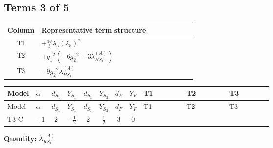 \documentclass[8pt]{article}
\begin{document}
\begin{landscape}
\subsection*{Terms 3 of 5}
\begin{center}
\begin{tabular}{@{}c >{\raggedright\arraybackslash}p{0.82\linewidth}@{}}
\toprule
Column & Representative term structure \\
\midrule
T1 & \(\displaystyle +\frac{16}{3} {\lambda_5} \left({\lambda_5}\right)^{*}\) \\
\midrule
T2 & \(\displaystyle +{g_1}^2 \left(-6 {g_2}^2-3 {\lambda_{HS_1}^{(A)}}\right)\) \\
\midrule
T3 & \(\displaystyle -9 {g_2}^2 {\lambda_{HS_1}^{(A)}}\) \\
\midrule
\bottomrule
\end{tabular}
\end{center}
\smallskip
\tiny
\begin{longtable}{@{}llcccccc >{\raggedright\arraybackslash}p{0.21\linewidth} >{\raggedright\arraybackslash}p{0.21\linewidth} >{\raggedright\arraybackslash}p{0.21\linewidth}@{}}
\toprule
Model & $\alpha$ & $d_{S_1}$ & $Y_{S_1}$ & $d_{S_2}$ & $Y_{S_2}$ & $d_F$ & $Y_F$ & T1 & T2 & T3 \\
\midrule
\endfirsthead
\toprule
Model & $\alpha$ & $d_{S_1}$ & $Y_{S_1}$ & $d_{S_2}$ & $Y_{S_2}$ & $d_F$ & $Y_F$ & T1 & T2 & T3 \\
\midrule
\endhead
T3-C & $-1$ & $2$ & $-\frac{1}{2}$ & $2$ & $\frac{1}{2}$ & $3$ & $0$ & \scriptsize\adjustbox{max width=\linewidth}{$\begin{gathered} +\frac{16}{3} {\lambda_5} \left({\lambda_5}\right)^{*}\end{gathered}$} & \scriptsize\adjustbox{max width=\linewidth}{$\begin{gathered} +{g_1}^2 \left(-6 {g_2}^2-3 {\lambda_{HS_1}^{(A)}}\right)\end{gathered}$} & \scriptsize\adjustbox{max width=\linewidth}{$\begin{gathered} -9 {g_2}^2 {\lambda_{HS_1}^{(A)}}\end{gathered}$} \\
\midrule
\bottomrule
\end{longtable}
\clearpage
\noindent\textbf{Quantity: }$\lambda_{HS_1}^{(A)}$\par\smallskip

\end{landscape}
\end{document}
